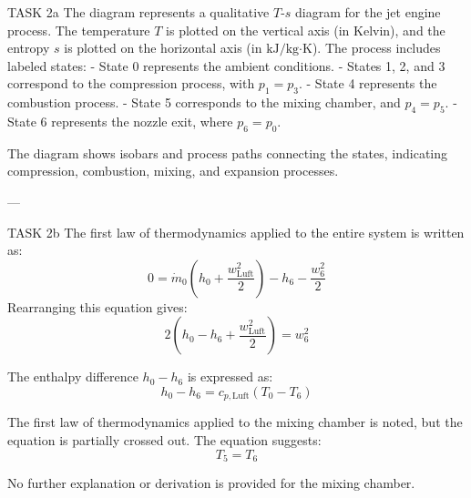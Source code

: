 TASK 2a  
The diagram represents a qualitative \( T \)-\( s \) diagram for the jet engine process. The temperature \( T \) is plotted on the vertical axis (in Kelvin), and the entropy \( s \) is plotted on the horizontal axis (in \( \text{kJ}/\text{kg·K} \)). The process includes labeled states:  
- State 0 represents the ambient conditions.  
- States 1, 2, and 3 correspond to the compression process, with \( p_1 = p_3 \).  
- State 4 represents the combustion process.  
- State 5 corresponds to the mixing chamber, and \( p_4 = p_5 \).  
- State 6 represents the nozzle exit, where \( p_6 = p_0 \).  

The diagram shows isobars and process paths connecting the states, indicating compression, combustion, mixing, and expansion processes.

---

TASK 2b  
The first law of thermodynamics applied to the entire system is written as:  
\[
0 = \dot{m}_0 \left( h_0 + \frac{w_{\text{Luft}}^2}{2} \right) - h_6 - \frac{w_6^2}{2}
\]  
Rearranging this equation gives:  
\[
2 \left( h_0 - h_6 + \frac{w_{\text{Luft}}^2}{2} \right) = w_6^2
\]  

The enthalpy difference \( h_0 - h_6 \) is expressed as:  
\[
h_0 - h_6 = c_{p,\text{Luft}} \left( T_0 - T_6 \right)
\]  

The first law of thermodynamics applied to the mixing chamber is noted, but the equation is partially crossed out. The equation suggests:  
\[
T_5 = T_6
\]  

No further explanation or derivation is provided for the mixing chamber.